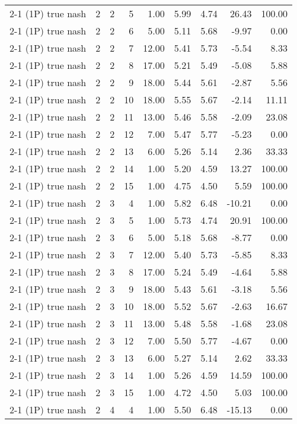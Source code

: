 \begin{tabular}{lrrrrrrrr}
2-1 (1P) true nash & 2 & 2 & 5 & 1.00 & 5.99 & 4.74 & 26.43 & 100.00 \\
2-1 (1P) true nash & 2 & 2 & 6 & 5.00 & 5.11 & 5.68 & -9.97 & 0.00 \\
2-1 (1P) true nash & 2 & 2 & 7 & 12.00 & 5.41 & 5.73 & -5.54 & 8.33 \\
2-1 (1P) true nash & 2 & 2 & 8 & 17.00 & 5.21 & 5.49 & -5.08 & 5.88 \\
2-1 (1P) true nash & 2 & 2 & 9 & 18.00 & 5.44 & 5.61 & -2.87 & 5.56 \\
2-1 (1P) true nash & 2 & 2 & 10 & 18.00 & 5.55 & 5.67 & -2.14 & 11.11 \\
2-1 (1P) true nash & 2 & 2 & 11 & 13.00 & 5.46 & 5.58 & -2.09 & 23.08 \\
2-1 (1P) true nash & 2 & 2 & 12 & 7.00 & 5.47 & 5.77 & -5.23 & 0.00 \\
2-1 (1P) true nash & 2 & 2 & 13 & 6.00 & 5.26 & 5.14 & 2.36 & 33.33 \\
2-1 (1P) true nash & 2 & 2 & 14 & 1.00 & 5.20 & 4.59 & 13.27 & 100.00 \\
2-1 (1P) true nash & 2 & 2 & 15 & 1.00 & 4.75 & 4.50 & 5.59 & 100.00 \\
2-1 (1P) true nash & 2 & 3 & 4 & 1.00 & 5.82 & 6.48 & -10.21 & 0.00 \\
2-1 (1P) true nash & 2 & 3 & 5 & 1.00 & 5.73 & 4.74 & 20.91 & 100.00 \\
2-1 (1P) true nash & 2 & 3 & 6 & 5.00 & 5.18 & 5.68 & -8.77 & 0.00 \\
2-1 (1P) true nash & 2 & 3 & 7 & 12.00 & 5.40 & 5.73 & -5.85 & 8.33 \\
2-1 (1P) true nash & 2 & 3 & 8 & 17.00 & 5.24 & 5.49 & -4.64 & 5.88 \\
2-1 (1P) true nash & 2 & 3 & 9 & 18.00 & 5.43 & 5.61 & -3.18 & 5.56 \\
2-1 (1P) true nash & 2 & 3 & 10 & 18.00 & 5.52 & 5.67 & -2.63 & 16.67 \\
2-1 (1P) true nash & 2 & 3 & 11 & 13.00 & 5.48 & 5.58 & -1.68 & 23.08 \\
2-1 (1P) true nash & 2 & 3 & 12 & 7.00 & 5.50 & 5.77 & -4.67 & 0.00 \\
2-1 (1P) true nash & 2 & 3 & 13 & 6.00 & 5.27 & 5.14 & 2.62 & 33.33 \\
2-1 (1P) true nash & 2 & 3 & 14 & 1.00 & 5.26 & 4.59 & 14.59 & 100.00 \\
2-1 (1P) true nash & 2 & 3 & 15 & 1.00 & 4.72 & 4.50 & 5.03 & 100.00 \\
2-1 (1P) true nash & 2 & 4 & 4 & 1.00 & 5.50 & 6.48 & -15.13 & 0.00 \\

\end{tabular}
